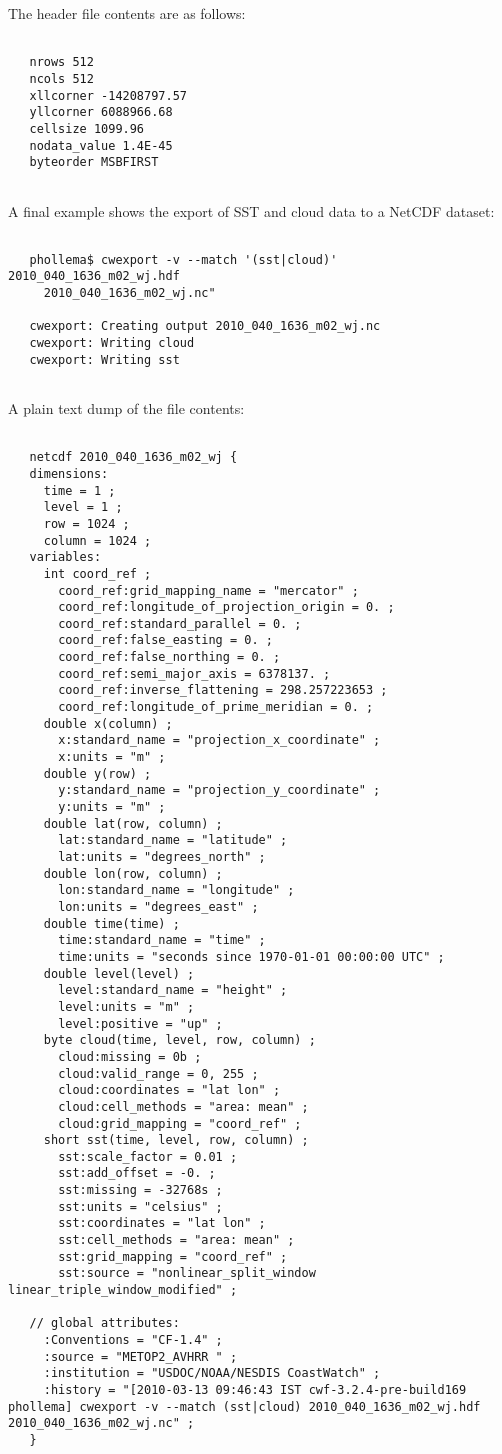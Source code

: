  The header file contents are as follows:
\begin{verbatim}

   nrows 512
   ncols 512
   xllcorner -14208797.57
   yllcorner 6088966.68
   cellsize 1099.96
   nodata_value 1.4E-45
   byteorder MSBFIRST
 
\end{verbatim}


 A final example shows the export of SST and cloud data to a NetCDF dataset:
\begin{verbatim}

   phollema$ cwexport -v --match '(sst|cloud)' 2010_040_1636_m02_wj.hdf 
     2010_040_1636_m02_wj.nc"

   cwexport: Creating output 2010_040_1636_m02_wj.nc
   cwexport: Writing cloud
   cwexport: Writing sst
 
\end{verbatim}


 A plain text dump of the file contents:
\begin{verbatim}

   netcdf 2010_040_1636_m02_wj {
   dimensions:
     time = 1 ;
     level = 1 ;
     row = 1024 ;
     column = 1024 ;
   variables:
     int coord_ref ;
       coord_ref:grid_mapping_name = "mercator" ;
       coord_ref:longitude_of_projection_origin = 0. ;
       coord_ref:standard_parallel = 0. ;
       coord_ref:false_easting = 0. ;
       coord_ref:false_northing = 0. ;
       coord_ref:semi_major_axis = 6378137. ;
       coord_ref:inverse_flattening = 298.257223653 ;
       coord_ref:longitude_of_prime_meridian = 0. ;
     double x(column) ;
       x:standard_name = "projection_x_coordinate" ;
       x:units = "m" ;
     double y(row) ;
       y:standard_name = "projection_y_coordinate" ;
       y:units = "m" ;
     double lat(row, column) ;
       lat:standard_name = "latitude" ;
       lat:units = "degrees_north" ;
     double lon(row, column) ;
       lon:standard_name = "longitude" ;
       lon:units = "degrees_east" ;
     double time(time) ;
       time:standard_name = "time" ;
       time:units = "seconds since 1970-01-01 00:00:00 UTC" ;
     double level(level) ;
       level:standard_name = "height" ;
       level:units = "m" ;
       level:positive = "up" ;
     byte cloud(time, level, row, column) ;
       cloud:missing = 0b ;
       cloud:valid_range = 0, 255 ;
       cloud:coordinates = "lat lon" ;
       cloud:cell_methods = "area: mean" ;
       cloud:grid_mapping = "coord_ref" ;
     short sst(time, level, row, column) ;
       sst:scale_factor = 0.01 ;
       sst:add_offset = -0. ;
       sst:missing = -32768s ;
       sst:units = "celsius" ;
       sst:coordinates = "lat lon" ;
       sst:cell_methods = "area: mean" ;
       sst:grid_mapping = "coord_ref" ;
       sst:source = "nonlinear_split_window linear_triple_window_modified" ;
 
   // global attributes:
     :Conventions = "CF-1.4" ;
     :source = "METOP2_AVHRR " ;
     :institution = "USDOC/NOAA/NESDIS CoastWatch" ;
     :history = "[2010-03-13 09:46:43 IST cwf-3.2.4-pre-build169 phollema] cwexport -v --match (sst|cloud) 2010_040_1636_m02_wj.hdf 2010_040_1636_m02_wj.nc" ;
   }
 
\end{verbatim}

